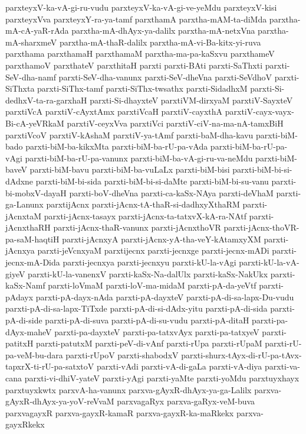 {parxteyxV-ka-vA-gi-ru-vudu
parxteyxV-ka-vA-gi-ve-yeMdu
parxteyxV-kisi
parxteyxVva
parxteyxY-ra-ya-tamf
parxthamA
parxtha-mAM-ta-diMda
parxtha-mA-cA-yaR-rAda
parxtha-mA-dhAyx-ya-dalilx
parxtha-mA-netxVna
parxtha-mA-sharxmeV
parxtha-mA-thaR-dalilx
parxtha-mA-vi-Ba-kitx-yi-ruva
parxthama
parxthamaH
parxthamaM
parxtha-ma-pa-kaSxvu
parxthameV
parxthamoV
parxthateV
parxthitaH
parxti
parxti-BAti
parxti-SaThxti
parxti-SeV-dha-namf
parxti-SeV-dha-vanunx
parxti-SeV-dheVna
parxti-SeVdhoV
parxti-SiThxta
parxti-SiThx-tamf
parxti-SiThx-twsathx
parxti-SidadhxM
parxti-Si-dedhxV-ta-ra-garxhaH
parxti-Si-dhayxteV
parxtiVM-dirxyaM
parxtiV-SayxteV
parxtiVcA
parxtiV-cAyxtAmx
parxtiVcaH
parxtiV-cayxthA
parxtiV-cayx-vayx-Bi-cA-yeVRkaM
parxtiV-ceyxVva
parxtiVci
parxtiV-ciV-na-ma-nA-tamxBiH
parxtiVcoV
parxtiV-kAshaM
parxtiV-ya-tAmf
parxti-baM-dha-kavu
parxti-biM-bado
parxti-biM-ba-kikxMta
parxti-biM-ba-rU-pa-vAda
parxti-biM-ba-rU-pa-vAgi
parxti-biM-ba-rU-pa-vanunx
parxti-biM-ba-vA-gi-ru-va-neMdu
parxti-biM-baveV
parxti-biM-bavu
parxti-biM-ba-vuLaLx
parxti-biM-bisi
parxti-biM-bi-si-dAdxne
parxti-biM-bi-sida
parxti-biM-bi-si-daMte
parxti-biM-bi-su-vanu
parxti-bi-mobxV-dayaH
parxti-boV-dheVna
parxti-ca-kaSx-NAya
parxti-deVhaM
parxti-ga-Lanunx
parxtijAcnx
parxti-jAcnx-tA-thaR-si-dadhxyXthaRM
parxti-jAcnxtaM
parxti-jAcnx-tasayx
parxti-jAcnx-ta-tatxvX-kA-ra-NAtf
parxti-jAcnxthaRH
parxti-jAcnx-thaR-vanunx
parxti-jAcnxthoVR
parxti-jAcnx-thoVR-pa-saM-haqtiH
parxti-jAcnxyA
parxti-jAcnx-yA-tha-veY-kAtamxyXM
parxti-jAcnxya
parxti-jeVcnxyaM
parxtijecnx
parxti-jecnxge
parxti-jecnx-mADi
parxti-jecnx-mA-Dida
parxti-jecnxya
parxti-jecnxyu
parxti-kU-la-vAgi
parxti-kU-la-vA-giyeV
parxti-kU-la-vanenxV
parxti-kaSx-Na-dalUlx
parxti-kaSx-NakUkx
parxti-kaSx-Namf
parxti-loVmaM
parxti-loV-ma-midaM
parxti-pA-da-yeVtf
parxti-pAdayx
parxti-pA-dayx-nAda
parxti-pA-dayxteV
parxti-pA-di-sa-lapx-Du-vudu
parxti-pA-di-sa-lapx-TiTxde
parxti-pA-di-si-dAdx-yitu
parxti-pA-di-sida
parxti-pA-di-side
parxti-pA-di-suva
parxti-pA-di-su-vudu
parxti-pA-ditaH
parxti-pa-dAyx-maheV
parxti-pa-dayxteV
parxti-pa-tatxvAyx
parxti-pa-tatxyeV
parxti-patitxH
parxti-patutxM
parxti-peV-di-vAnf
parxti-rUpa
parxti-rUpaM
parxti-rU-pa-veM-bu-dara
parxti-rUpoV
parxti-shabodxV
parxti-shurx-tAyx-di-rU-pa-tAvx-tapxrX-ti-rU-pa-satxtoV
parxti-vAdi
parxti-vA-di-gaLa
parxti-vA-diya
parxti-va-cana
parxti-vi-dhiV-yateV
parxti-yAgi
parxti-yaMte
parxti-yoMdu
parxtuyxhayx
parxtuyxkwtx
parxvA-ha-vanunx
parxva-gAyxR-dhAyx-ya-ga-Lalilx
parxva-gAyxR-dhAyx-ya-yoV-reVvaM
parxvagaRyx
parxva-gaRyx-veM-buva
parxvagayxR
parxva-gayxR-kamaR
parxva-gayxR-ka-maRkekx
parxva-gayxRkekx
}
